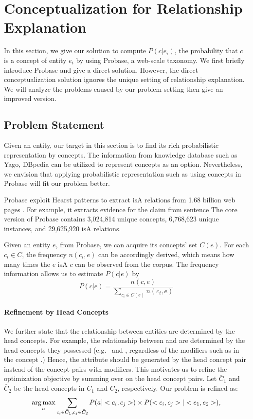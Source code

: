 \section{Conceptualization for Relationship Explanation}
\label{sec:conceptualization}
In this section, we give our solution to compute $P(c|e_i)$, the probability that $c$ is a concept of entity $e_i$ by using \ac{Probase}, a web-scale taxonomy.
We first briefly introduce Probase and give a direct solution.
However, the direct conceptualization solution ignores the unique setting of relationship explanation.
We will analyze the problems caused by our problem setting then give an improved version.

\subsection{Problem Statement}
Given an entity, our target in this section is to find its rich probabilistic representation by concepts.
The  information from knowledge database such as Yago, DBpedia can be utilized to represent concepts as an option.
Nevertheless, we envision that applying probabilistic representation such as using concepts in \ac{Probase} will fit our problem better.

Probase exploit Hearst patterns to extract isA relations from 1.68 billion web pages .
For example, it extracts evidence for the claim  from sentence 
The core version of Probase contains 3,024,814 unique concepts, 6,768,623 unique instances, and 29,625,920 isA relations.

Given an entity $e$, from Probase, we can acquire its concepts' set $C(e)$.
For each $c_i \in C$, the frequency $n(c_i,e)$ can be accordingly derived, which means how many times the $e$ isA $c$ can be observed from the corpus.
The frequency information allows us to estimate  $P(c|e)$ by
$$P(c|e)=\frac{n(c,e)}{\sum_{c_i\in C(e)}n(c_i, e)}$$


\paragraph{Refinement by Head Concepts}
We further state that the relationship between entities are determined by the head concepts.
For example, the  relationship between  and  are determined by the head concepts they possessed (e.g.\  and , regardless of the modifiers such as  in the concept .)
Hence, the attribute should be generated by the head concept pair instead of the concept pairs with modifiers.
This motivates us to refine the optimization objective by summing over on the head concept pairs.
Let $\bar{C}_1$ and $\bar{C}_2$ be the head concepts in  $C_1$ and $C_2$, respectively.
Our problem is refined as:
\begin{equation}
\label{eq:target}
\operatorname*{arg\,max}_a \sum_{c_i\in \bar{C}_1 , c_j \in \bar{C}_2 }P(a|<c_{i},c_{j}>)\times P(<c_{i},c_{j}>|<e_{1},e_{2}>),
\end{equation}

